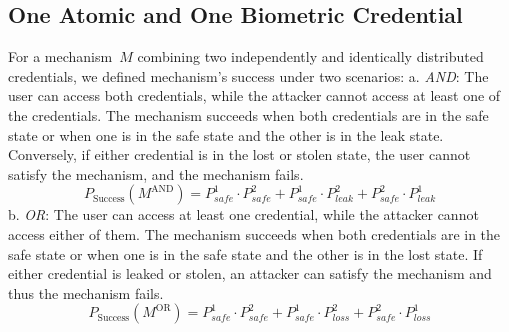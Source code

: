 \documentclass[conference,compsoc]{IEEEtran}
\begin{document}
\subsection{One Atomic and One Biometric Credential}\label{sec:atm_biocred}
\noindent
For a mechanism~$M$ combining two independently and identically distributed credentials, we defined mechanism's success under two scenarios:
a. \emph{AND}: The user can access both credentials, while the attacker cannot access at least one of the credentials. The mechanism succeeds when both credentials are in the safe state or when one is in the safe state and the other is in the leak state. Conversely, if either credential is in the lost or stolen state, the user cannot satisfy the mechanism, and the mechanism fails.
\begin{equation}
    \label{eqn:andsuccess}
P_{\text{Success}}(M^{\text{AND}}) = P^1_{safe} \cdot P^2_{safe} + P^1_{safe} \cdot P^2_{leak} + P^2_{safe} \cdot P^1_{leak}
\end{equation}
\noindent
b. \emph{OR}: The user can access at least one credential, while the attacker cannot access either of them. The mechanism succeeds when both credentials are in the safe state or when one is in the safe state and the other is in the lost state. If either credential is leaked or stolen, an attacker can satisfy the mechanism and thus the mechanism fails.
\begin{equation}
    \label{eqn:orsuccess}
P_{\text{Success}}(M^{\text{OR}}) = P^1_{safe} \cdot P^2_{safe} + P^1_{safe} \cdot P^2_{loss} + P^2_{safe} \cdot P^1_{loss}
\end{equation}
\end{document}
